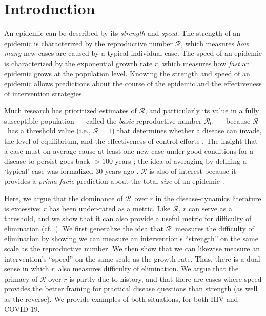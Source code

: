\documentclass[12pt]{article}
\newcommand{\RR}{\ensuremath{{\mathcal R}}}
\newcommand{\Rx}[1]{\ensuremath{\RR_{\mathrm{#1}}}} %
\newcommand{\Ro}{\Rx{0}} %
\newcommand{\rr}{\ensuremath{{r}}}
\providecommand{\DIFaddtex}[1]{{\protect\color{blue}\uwave{#1}}} %
\providecommand{\DIFdeltex}[1]{{\protect\color{red}\sout{#1}}}                      %
\providecommand{\DIFaddbegin}{} %
\providecommand{\DIFaddend}{} %
\providecommand{\DIFdelbegin}{} %
\providecommand{\DIFdelend}{} %
\providecommand{\DIFadd}[1]{\texorpdfstring{\DIFaddtex{#1}}{#1}} %
\providecommand{\DIFdel}[1]{\texorpdfstring{\DIFdeltex{#1}}{}} %
\newcommand{\DIFscaledelfig}{0.5}
\newlength{\DIFdelgraphicswidth} %
\newlength{\DIFdelgraphicsheight} %
\newcommand{\DIFaddincludegraphics}[2][]{{\color{blue}\fbox{\DIFOincludegraphics[#1]{#2}}}} %
\newcommand{\DIFdelincludegraphics}[2][]{%
\sbox{\DIFdelgraphicsbox}{\DIFOincludegraphics[#1]{#2}}%
\settoboxwidth{\DIFdelgraphicswidth}{\DIFdelgraphicsbox} %
\settoboxtotalheight{\DIFdelgraphicsheight}{\DIFdelgraphicsbox} %
\scalebox{\DIFscaledelfig}{%
\parbox[b]{\DIFdelgraphicswidth}{\usebox{\DIFdelgraphicsbox}\\[-\baselineskip] \rule{\DIFdelgraphicswidth}{0em}}\llap{\resizebox{\DIFdelgraphicswidth}{\DIFdelgraphicsheight}{%
\setlength{\unitlength}{\DIFdelgraphicswidth}%
\begin{picture}(1,1)%
\thicklines\linethickness{2pt} %
{\color[rgb]{1,0,0}\put(0,0){\framebox(1,1){}}}%
{\color[rgb]{1,0,0}\put(0,0){\line( 1,1){1}}}%
{\color[rgb]{1,0,0}\put(0,1){\line(1,-1){1}}}%
\end{picture}%
}\hspace*{3pt}}} %
} %
\DeclareRobustCommand{\DIFaddbegin}{\DIFOaddbegin \let\includegraphics\DIFaddincludegraphics} %
\DeclareRobustCommand{\DIFaddend}{\DIFOaddend \let\includegraphics\DIFOincludegraphics} %
\DeclareRobustCommand{\DIFdelbegin}{\DIFOdelbegin \let\includegraphics\DIFdelincludegraphics} %
\DeclareRobustCommand{\DIFdelend}{\DIFOaddend \let\includegraphics\DIFOincludegraphics} %
\begin{document}
\pagebreak

\section{Introduction}

An epidemic can be described by its \emph{strength} and \emph{speed}.
The strength of an epidemic is characterized by the reproductive number \RR, which measures \emph{how many} new cases are caused by a typical individual case.
The speed of an epidemic is characterized by the exponential growth rate $r$, which measures how \emph{fast} an epidemic grows at the population level.
Knowing the strength and speed of an epidemic allows predictions about the course of the epidemic and the effectiveness of intervention strategies.

Much research has prioritized estimates of \RR, and particularly its value in a fully susceptible population --- called the \emph{basic} reproductive number \Ro\DIFdelbegin \DIFdel{\, }\DIFdelend \DIFaddbegin \DIFadd{, }\DIFaddend --- because \RR\ has a threshold value (i.e., $\RR=1$) that determines whether a disease can invade, the level of equilibrium, and the effectiveness of control efforts \citep{anderson1991infectious, diekmann1990definition}.
The insight that a case must on average cause at least one new case under good conditions for a disease to persist goes back $>100$ years \citep{ross1911prevention};
the idea of averaging by defining a `typical' case was formalized 30 years ago \citep{diekmann1990definition}.
$\RR$ is also of interest because it provides a \emph{prima facie} prediction about the total \emph{size} of an epidemic \citep{anderson1991infectious, ma2006generality, arino2007final, andreasen2011final, miller2012note}.

Here, we argue that the dominance of \RR\ over $r$ in the disease-dynamics literature is excessive: $r$ has been under-rated as a metric. Like \RR,  $r$ can serve as a threshold, and we show that it can also provide a useful metric for difficulty of elimination (cf.~\cite{ferretti2020quantifying}). 
We first generalize the idea that \RR\ measures the difficulty of elimination by showing we can measure an intervention's ``strength'' on the same scale as the reproductive number. 
We then show that we can likewise measure an intervention's ``speed'' on the same scale as the growth rate.
Thus, there is a dual sense in which \rr\ also measures difficulty of elimination. 
We argue that the primacy of $\RR$ over $r$ is partly due to history, and that there are cases where speed provides the better framing for practical disease questions than strength (as well as the reverse). We provide examples of both situations, for both HIV and COVID-19.
\end{document}
